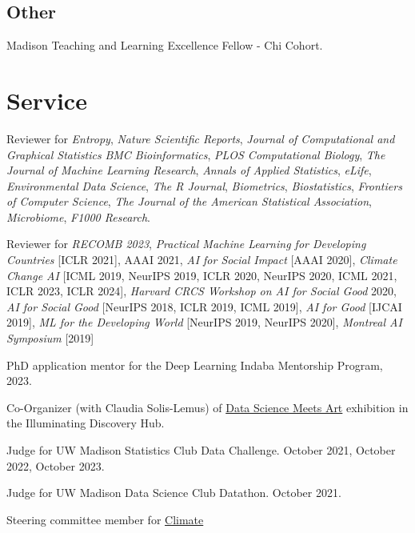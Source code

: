 \documentclass[letterpaper]{article}
\renewenvironment{itemize}{
  \begin{list}{}{
    \setlength{\leftmargin}{1.5em}
  }
}{
  \end{list}
}
\begin{document}
\subsection*{Other}
\begin{itemize}
\item Madison Teaching and Learning Excellence Fellow - Chi Cohort.
\end{itemize}

\section*{Service}

\begin{itemize}
\item Reviewer for \textit{Entropy}, \textit{Nature Scientific Reports}, \textit{Journal of Computational and Graphical Statistics} \textit{BMC Bioinformatics}, \textit{PLOS Computational
Biology}, \textit{The Journal of Machine Learning Research}, \textit{Annals of
Applied Statistics}, \textit{eLife}, \textit{Environmental Data Science}, \textit{The R Journal},
\textit{Biometrics}, \textit{Biostatistics}, \textit{Frontiers of Computer
Science}, \textit{The Journal of the American Statistical Association},
\textit{Microbiome}, \textit{F1000 Research}.
\item Reviewer for \textit{RECOMB 2023}, \textit{Practical Machine Learning for Developing Countries}
  [ICLR 2021], AAAI 2021, \textit{AI for Social Impact} [AAAI 2020],
  \textit{Climate Change AI} [ICML 2019, NeurIPS 2019, ICLR 2020, NeurIPS 2020, ICML 2021, ICLR 2023, ICLR 2024],
  \textit{Harvard CRCS Workshop on AI for Social Good} 2020, \textit{AI for
    Social Good} [NeurIPS 2018, ICLR 2019, ICML 2019], \textit{AI for Good}
         [IJCAI 2019], \textit{ML for the Developing World} [NeurIPS 2019,
           NeurIPS 2020], \textit{Montreal AI Symposium} [2019]
\item PhD application mentor for the Deep Learning Indaba Mentorship Program, 2023.
\item Co-Organizer (with Claudia Solis-Lemus) of
\href{https://illuminatingdiscovery.wisc.edu/technical-to-beautiful-data-as-art/}{Data Science Meets Art} exhibition in the Illuminating Discovery Hub.
\item Judge for UW Madison Statistics Club Data Challenge. October 2021, October 2022, October 2023.
\item Judge for UW Madison Data Science Club Datathon. October 2021.
\item Steering committee member for \href{https://www.climatechange.ai}{Climate
}
\end{itemize}
\end{document}
